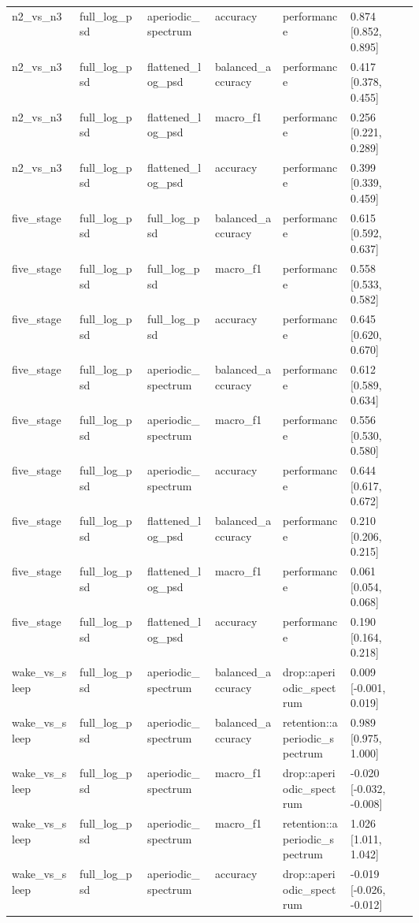 \begin{longtable}{p{0.10\linewidth}p{0.10\linewidth}p{0.10\linewidth}p{0.10\linewidth}p{0.10\linewidth}p{0.10\linewidth}}
n2\_vs\_n3 & full\_log\_psd & aperiodic\_spectrum & accuracy & performance & 0.874 [0.852, 0.895]\\
n2\_vs\_n3 & full\_log\_psd & flattened\_log\_psd & balanced\_accuracy & performance & 0.417 [0.378, 0.455]\\
n2\_vs\_n3 & full\_log\_psd & flattened\_log\_psd & macro\_f1 & performance & 0.256 [0.221, 0.289]\\
n2\_vs\_n3 & full\_log\_psd & flattened\_log\_psd & accuracy & performance & 0.399 [0.339, 0.459]\\
five\_stage & full\_log\_psd & full\_log\_psd & balanced\_accuracy & performance & 0.615 [0.592, 0.637]\\
five\_stage & full\_log\_psd & full\_log\_psd & macro\_f1 & performance & 0.558 [0.533, 0.582]\\
five\_stage & full\_log\_psd & full\_log\_psd & accuracy & performance & 0.645 [0.620, 0.670]\\
five\_stage & full\_log\_psd & aperiodic\_spectrum & balanced\_accuracy & performance & 0.612 [0.589, 0.634]\\
five\_stage & full\_log\_psd & aperiodic\_spectrum & macro\_f1 & performance & 0.556 [0.530, 0.580]\\
five\_stage & full\_log\_psd & aperiodic\_spectrum & accuracy & performance & 0.644 [0.617, 0.672]\\
five\_stage & full\_log\_psd & flattened\_log\_psd & balanced\_accuracy & performance & 0.210 [0.206, 0.215]\\
five\_stage & full\_log\_psd & flattened\_log\_psd & macro\_f1 & performance & 0.061 [0.054, 0.068]\\
five\_stage & full\_log\_psd & flattened\_log\_psd & accuracy & performance & 0.190 [0.164, 0.218]\\
wake\_vs\_sleep & full\_log\_psd & aperiodic\_spectrum & balanced\_accuracy & drop::aperiodic\_spectrum & 0.009 [-0.001, 0.019]\\
wake\_vs\_sleep & full\_log\_psd & aperiodic\_spectrum & balanced\_accuracy & retention::aperiodic\_spectrum & 0.989 [0.975, 1.000]\\
wake\_vs\_sleep & full\_log\_psd & aperiodic\_spectrum & macro\_f1 & drop::aperiodic\_spectrum & -0.020 [-0.032, -0.008]\\
wake\_vs\_sleep & full\_log\_psd & aperiodic\_spectrum & macro\_f1 & retention::aperiodic\_spectrum & 1.026 [1.011, 1.042]\\
wake\_vs\_sleep & full\_log\_psd & aperiodic\_spectrum & accuracy & drop::aperiodic\_spectrum & -0.019 [-0.026, -0.012]\\

\end{longtable}
